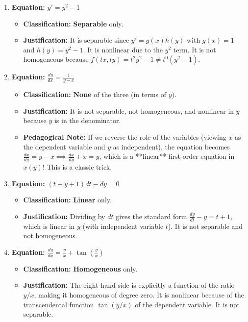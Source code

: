 \documentclass[11pt,letterpaper]{article}
\begin{document}
\begin{enumerate}[label=\textbf{\arabic*.}]
    \item \textbf{Equation:} $y' = y^2 - 1$
    \begin{itemize}
        \item \textbf{Classification:} \textbf{Separable} only.
        \item \textbf{Justification:} It is separable since $y' = g(x)h(y)$ with $g(x) = 1$ and $h(y) = y^2-1$. It is nonlinear due to the $y^2$ term. It is not homogeneous because $f(tx, ty) = t^2y^2 - 1 \neq t^0(y^2-1)$.
    \end{itemize}

    \item \textbf{Equation:} $\frac{dy}{dx} = \frac{1}{y-x}$
    \begin{itemize}
        \item \textbf{Classification:} \textbf{None} of the three (in terms of $y$).
        \item \textbf{Justification:} It is not separable, not homogeneous, and nonlinear in $y$ because $y$ is in the denominator. 
        \item \textbf{Pedagogical Note:} If we reverse the role of the variables (viewing $x$ as the dependent variable and $y$ as independent), the equation becomes $\frac{dx}{dy} = y - x \implies \frac{dx}{dy} + x = y$, which is a **linear** first-order equation in $x(y)$! This is a classic trick.
    \end{itemize}

    \item \textbf{Equation:} $(t+y+1)dt - dy = 0$
    \begin{itemize}
        \item \textbf{Classification:} \textbf{Linear} only.
        \item \textbf{Justification:} Dividing by $dt$ gives the standard form $\frac{dy}{dt} - y = t+1$, which is linear in $y$ (with independent variable $t$). It is not separable and not homogeneous.
    \end{itemize}

    \item \textbf{Equation:} $\frac{dy}{dx} = \frac{y}{x} + \tan\left(\frac{y}{x}\right)$
    \begin{itemize}
        \item \textbf{Classification:} \textbf{Homogeneous} only.
        \item \textbf{Justification:} The right-hand side is explicitly a function of the ratio $y/x$, making it homogeneous of degree zero. It is nonlinear because of the transcendental function $\tan(y/x)$ of the dependent variable. It is not separable.
    \end{itemize}


\end{enumerate}
\end{document}
